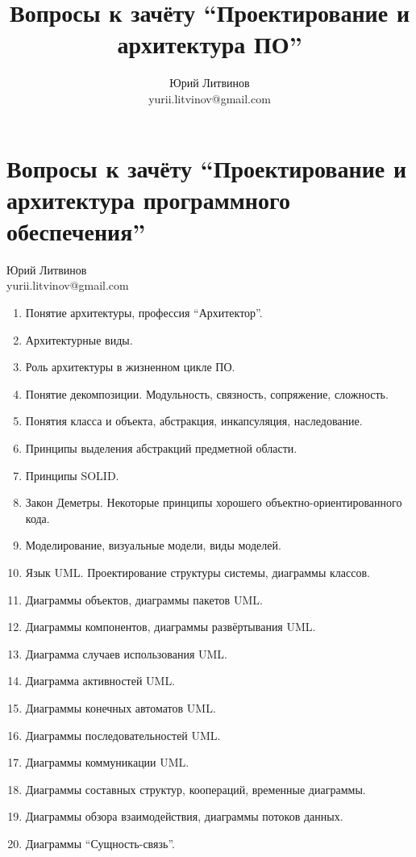 \documentclass[a5paper]{article}
\title{Вопросы к зачёту ``Проектирование и архитектура ПО''}
\author{Юрий Литвинов\\\small{yurii.litvinov@gmail.com}}
\begin{document}
\thispagestyle{empty}

\section*{Вопросы к зачёту ``Проектирование и архитектура программного обеспечения''}

\begin{flushright}\begin{small}Юрий Литвинов\\\small{yurii.litvinov@gmail.com}\end{small}\end{flushright}

\begin{enumerate}
    \item Понятие архитектуры, профессия ``Архитектор''.
    \item Архитектурные виды.
    \item Роль архитектуры в жизненном цикле ПО.
    \item Понятие декомпозиции. Модульность, связность, сопряжение, сложность.
    \item Понятия класса и объекта, абстракция, инкапсуляция, наследование.
    \item Принципы выделения абстракций предметной области.
    \item Принципы SOLID.
    \item Закон Деметры. Некоторые принципы хорошего объектно-ориентированного кода.
    \item Моделирование, визуальные модели, виды моделей.
    \item Язык UML. Проектирование структуры системы, диаграммы классов.
    \item Диаграммы объектов, диаграммы пакетов UML.
    \item Диаграммы компонентов, диаграммы развёртывания UML.
    \item Диаграмма случаев использования UML.
    \item Диаграмма активностей UML.
    \item Диаграммы конечных автоматов UML.
    \item Диаграммы последовательностей UML.
    \item Диаграммы коммуникации UML.
    \item Диаграммы составных структур, коопераций, временные диаграммы.
    \item Диаграммы обзора взаимодействия, диаграммы потоков данных.
    \item Диаграммы ``Сущность-связь''.

\end{enumerate}
\end{document}
